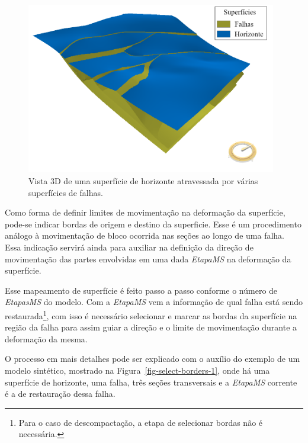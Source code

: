 \begin{figure} [H]
  \begin{center}
    \includegraphics[width=310pt]{images/fig-surfaces-horizon-faults}
    \caption{Vista 3D de uma superfície de horizonte atravessada por várias superfícies de falhas.}\label{fig-surfaces-horizon-faults}
  \end{center}
\end{figure}

Como forma de definir limites de movimentação na deformação da superfície, pode-se indicar bordas de origem e destino da superficie. Esse é um procedimento análogo à movimentação de bloco ocorrida nas seções ao longo de uma falha. Essa indicação servirá ainda para auxiliar na definição da direção de movimentação das partes envolvidas em uma dada \textit{EtapaMS} na deformação da superfície.

Esse mapeamento de superfície é feito passo a passo conforme o número de \textit{EtapasMS} do modelo. Com a \textit{EtapaMS} vem a informação de qual falha está sendo restaurada\footnote{Para o caso de descompactação, a etapa de selecionar bordas não é necessária.}, com isso é necessário selecionar e marcar as bordas da superfície na região da falha para assim guiar a direção e o limite de movimentação durante a deformação da mesma.

O processo em mais detalhes pode ser explicado com o auxílio do exemplo de um modelo sintético, mostrado na Figura~\ref{fig-select-borders-1}, onde há uma superfície de horizonte, uma falha, três seções transversais e a \textit{EtapaMS} corrente é a de restauração dessa falha.

